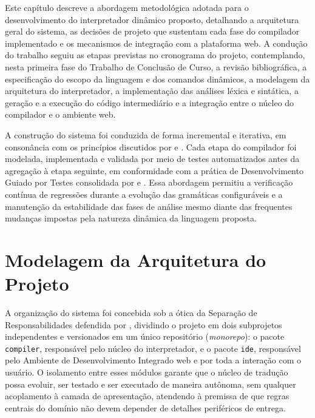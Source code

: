 
Este capítulo descreve a abordagem metodológica adotada para o desenvolvimento do interpretador dinâmico proposto, detalhando a arquitetura geral do sistema, as decisões de projeto que sustentam cada fase do compilador implementado e os mecanismos de integração com a plataforma web. A condução do trabalho seguiu as etapas previstas no cronograma do projeto, contemplando, nesta primeira fase do Trabalho de Conclusão de Curso, a revisão bibliográfica, a especificação do escopo da linguagem e dos comandos dinâmicos, a modelagem da arquitetura do interpretador, a implementação das análises léxica e sintática, a geração e a execução do código intermediário e a integração entre o núcleo do compilador e o ambiente web.

A construção do sistema foi conduzida de forma incremental e iterativa, em consonância com os princípios discutidos por  e . Cada etapa do compilador foi modelada, implementada e validada por meio de testes automatizados antes da agregação à etapa seguinte, em conformidade com a prática de Desenvolvimento Guiado por Testes consolidada por  e . Essa abordagem permitiu a verificação contínua de regressões durante a evolução das gramáticas configuráveis e a manutenção da estabilidade das fases de análise mesmo diante das frequentes mudanças impostas pela natureza dinâmica da linguagem proposta.

\section{Modelagem da Arquitetura do Projeto}
\label{sec:modelagem-arquitetura}

A organização do sistema foi concebida sob a ótica da Separação de Responsabilidades defendida por , dividindo o projeto em dois subprojetos independentes e versionados em um único repositório (\textit{monorepo}): o pacote \texttt{compiler}, responsável pelo núcleo do interpretador, e o pacote \texttt{ide}, responsável pelo Ambiente de Desenvolvimento Integrado web e por toda a interação com o usuário. O isolamento entre esses módulos garante que o núcleo de tradução possa evoluir, ser testado e ser executado de maneira autônoma, sem qualquer acoplamento à camada de apresentação, atendendo à premissa de que regras centrais do domínio não devem depender de detalhes periféricos de entrega.


